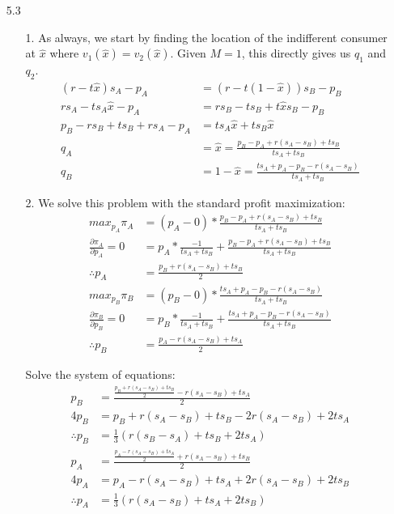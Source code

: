 \documentclass[12pt,letterpaper]{article}
\begin{document}
\begin{enumerate}
\item[5.3]
\begin{enumerate}
	\item[1.]
	As always, we start by finding the location of the indifferent consumer at $\hat{x}$ where $v_1(\hat{x}) = v_2(\hat{x})$. Given $M=1$, this directly gives us $q_1$ and $q_2$. 
	\begin{align*}
		(r-t\hat{x})s_A - p_A &= (r - t(1-\hat{x}))s_B - p_B \\
		rs_A - ts_A\hat{x} - p_A &= rs_B - ts_B + t\hat{x}s_B - p_B \\
		p_B - rs_B + ts_B + rs_A - p_A &= ts_A\hat{x} + ts_B\hat{x} \\
		q_A &= \hat{x} = \frac{p_B - p_A + r(s_A - s_B) + ts_B}{ts_A + ts_B} \\
		q_B &= 1 - \hat{x} = \frac{ts_A + p_A - p_B - r(s_A - s_B)}{ts_A + ts_B}
	\end{align*}
	\item[2.] 
	We solve this problem with the standard profit maximization:
	\begin{align*}
		max_{p_A} \pi_A &= (p_A - 0) * \frac{p_B - p_A + r(s_A - s_B) + ts_B}{ts_A + ts_B} \\
		\frac{\partial \pi_A}{\partial p_A} = 0 &= p_A * \frac{-1}{ts_A + ts_B} + \frac{p_B - p_A + r(s_A - s_B) + ts_B}{ts_A + ts_B} \\
		\therefore p_A &= \frac{p_B + r(s_A - s_B) + ts_B}{2} \\
		max_{p_B} \pi_B &= (p_B - 0) * \frac{ts_A + p_A - p_B - r(s_A - s_B)}{ts_A + ts_B} \\
		\frac{\partial \pi_B}{\partial p_B} = 0 &= p_B * \frac{-1}{ts_A + ts_B} + \frac{ts_A + p_A - p_B - r(s_A - s_B)}{ts_A + ts_B} \\
		\therefore p_B &= \frac{p_A - r(s_A - s_B) + ts_A}{2}
	\end{align*}

	Solve the system of equations:
	\begin{align*}
		p_B &= \frac{\frac{p_B + r(s_A - s_B) + ts_B}{2} - r(s_A - s_B) + ts_A}{2} \\
		4p_B &= p_B + r(s_A - s_B) + ts_B - 2r(s_A-s_B) + 2ts_A \\
		\therefore p_B &= \frac{1}{3} (r(s_B - s_A) + ts_B + 2ts_A) \\
		p_A &= \frac{\frac{p_A - r(s_A - s_B) + ts_A}{2} + r(s_A - s_B) + ts_B}{2} \\
		4p_A &= p_A - r(s_A - s_B) + ts_A + 2r(s_A -s_B) + 2ts_B \\
		\therefore p_A &= \frac{1}{3} (r(s_A - s_B) + ts_A + 2ts_B)
	\end{align*}


\end{enumerate}
\end{enumerate}
\end{document}
